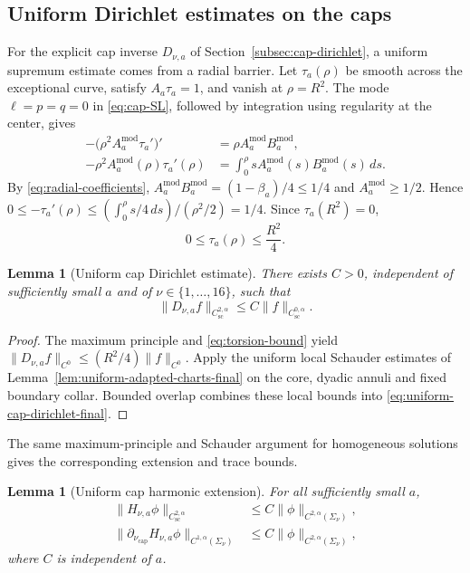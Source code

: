 \documentclass[11pt,a4paper,twoside]{article}
\numberwithin{equation}{section}
\newtheorem{lemma}[theorem]{Lemma}
\theoremstyle{definition}
\theoremstyle{remark}
\begin{document}
\subsection{Uniform Dirichlet estimates on the caps}
\label{subsec:uniform-cap-estimates}

For the explicit cap inverse \(D_{\nu,a}\) of
Section~\ref{subsec:cap-dirichlet}, a uniform supremum estimate
comes from a radial barrier. Let \(\tau_a(\rho)\) be smooth across
the exceptional curve, satisfy \(A_a\tau_a=1\), and vanish at
\(\rho=R^2\). The mode \(\ell=p=q=0\) in \eqref{eq:cap-SL},
followed by integration using regularity at the center, gives
\[
\begin{aligned}
-\bigl(\rho^2A_a^{\mathrm{mod}}\tau_a'\bigr)'
&=\rho A_a^{\mathrm{mod}}B_a^{\mathrm{mod}},\\
-\rho^2A_a^{\mathrm{mod}}(\rho)\tau_a'(\rho)
&=\int_0^\rho sA_a^{\mathrm{mod}}(s)B_a^{\mathrm{mod}}(s)\,ds.
\end{aligned}
\]
By \eqref{eq:radial-coefficients},
\(A_a^{\mathrm{mod}}B_a^{\mathrm{mod}}=(1-\beta_a)/4\le1/4\)
and \(A_a^{\mathrm{mod}}\ge1/2\). Hence
\(0\le-\tau_a'(\rho)\le(\int_0^\rho s/4\,ds)/(\rho^2/2)=1/4\).
Since \(\tau_a(R^2)=0\),
\begin{equation}\label{eq:torsion-bound}
0\le\tau_a(\rho)\le\frac{R^2}{4}.
\end{equation}
\begin{lemma}[Uniform cap Dirichlet estimate]
\label{lem:uniform-cap-dirichlet-final}
There exists \(C>0\), independent of sufficiently small \(a\)
and of \(\nu\in\{1,\ldots,16\}\), such that
\begin{equation}\label{eq:uniform-cap-dirichlet-final}
\|D_{\nu,a}f\|_{C_{\mathrm{sc}}^{2,\alpha}}
\le C\|f\|_{C_{\mathrm{sc}}^{0,\alpha}}.
\end{equation}
\end{lemma}
\begin{proof}
The maximum principle and \eqref{eq:torsion-bound} yield
\(\|D_{\nu,a}f\|_{C^0}\le(R^2/4)\|f\|_{C^0}\). Apply the
uniform local Schauder estimates of
Lemma~\ref{lem:uniform-adapted-charts-final} on the core, dyadic
annuli and fixed boundary collar. Bounded overlap combines these
local bounds into \eqref{eq:uniform-cap-dirichlet-final}.
\end{proof}
The same maximum-principle and Schauder argument for homogeneous
solutions gives the corresponding extension and trace bounds.
\begin{lemma}[Uniform cap harmonic extension]
\label{lem:uniform-cap-harmonic}
For all sufficiently small \(a\),
\[
\begin{aligned}
\|H_{\nu,a}\phi\|_{C_{\mathrm{sc}}^{2,\alpha}}
&\le C\|\phi\|_{C^{2,\alpha}(\Sigma_\nu)},\\
\|\partial_{\nu_{\mathrm{cap}}}H_{\nu,a}\phi\|_{C^{1,\alpha}(\Sigma_\nu)}
&\le C\|\phi\|_{C^{2,\alpha}(\Sigma_\nu)},
\end{aligned}
\]
where \(C\) is independent of \(a\).
\end{lemma}
\end{document}
